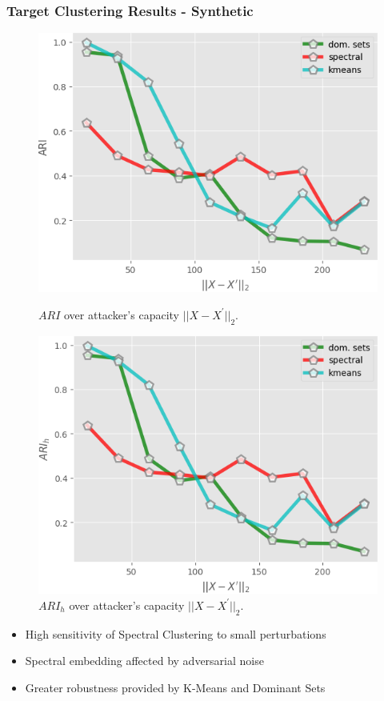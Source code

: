 \documentclass{beamer}
\begin{document}
\begin{frame}
	\frametitle{Target Clustering Results - Synthetic}
		\begin{figure}[H]
		\begin{minipage}[t]{0.45\linewidth}
			\centering
			\includegraphics[width=1\textwidth]{img/target/X2_ARI.png}
			\caption{\footnotesize $ARI$ over attacker's capacity  $\vert \vert X - X^\prime\vert \vert_2$.}
		\end{minipage}        
		\hspace{.1cm}
		\begin{minipage}[t]{0.45\linewidth}
			\centering
			\includegraphics[width=1\textwidth]{img/target/X2_ARIh.png}
			\caption{\footnotesize $ARI_h$ over attacker's capacity $\vert \vert X - X^\prime\vert \vert_2$.}
		\end{minipage}
	\end{figure}
	\changefontsizes{8pt}
\begin{itemize}
	\item High sensitivity of Spectral Clustering to small perturbations
	\item Spectral embedding affected by adversarial noise
	\item Greater robustness provided by K-Means and Dominant Sets
\end{itemize}
\end{frame}
\end{document}
